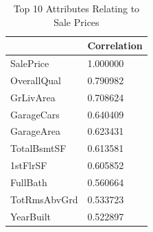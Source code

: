 \documentclass[letterpaper,10pt]{article}
\begin{document}
\begin{table}[H]
\centering
\begin{tabular}{ |p{4cm}|P{4cm}| } 
 \hline
  & Correlation \\ 
 \hline
 SalePrice & 1.000000 \\ 
 \hline
 OverallQual & 0.790982 \\ 
 \hline
 GrLivArea & 0.708624 \\ 
 \hline
 GarageCars & 0.640409 \\ 
 \hline
 GarageArea & 0.623431 \\ 
 \hline
 TotalBsmtSF & 0.613581 \\ 
 \hline
 1stFlrSF & 0.605852 \\ 
 \hline
 FullBath & 0.560664 \\ 
 \hline
 TotRmsAbvGrd & 0.533723 \\ 
 \hline
 YearBuilt & 0.522897 \\ 
 \hline
\end{tabular}
\caption{Top 10 Attributes Relating to Sale Prices}
\label{table:1}
\end{table}
\end{document}

